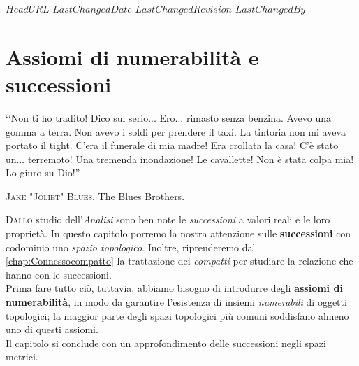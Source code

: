 \svnidlong
{$HeadURL$}
{$LastChangedDate$}
{$LastChangedRevision$}
{$LastChangedBy$}

\chapter{Assiomi di numerabilità e successioni}

\begin{introduction}
‘‘Non ti ho tradito! Dico sul serio... Ero... rimasto senza benzina. Avevo una gomma a terra. Non avevo i soldi per prendere il taxi. La tintoria non mi aveva portato il tight. C'era il funerale di mia madre! Era crollata la casa! C'è stato un... terremoto! Una tremenda inondazione! Le cavallette! Non è stata colpa mia! Lo giuro su Dio!''
\begin{flushright}
	\textsc{Jake "Joliet" Blues,} The Blues Brothers.
\end{flushright}
\end{introduction}
\lettrine[findent=1pt, nindent=0pt]{D}{allo}  studio dell'\textit{Analisi} sono ben note le \textit{successioni} a valori reali e le loro proprietà. In questo capitolo porremo la nostra attenzione sulle \textbf{successioni} con codominio uno \textit{spazio topologico}. Inoltre, riprenderemo dal \autoref{chap:Connessocompatto} la trattazione dei \textit{compatti} per studiare la relazione che hanno con le successioni.\\
Prima fare tutto ciò, tuttavia, abbiamo bisogno di introdurre degli \textbf{assiomi di numerabilità}, in modo da garantire l'esistenza di insiemi \textit{numerabili} di oggetti topologici; la maggior parte degli spazi topologici più comuni soddisfano almeno uno di questi assiomi.\\
Il capitolo si conclude con un approfondimento delle successioni negli spazi metrici.
